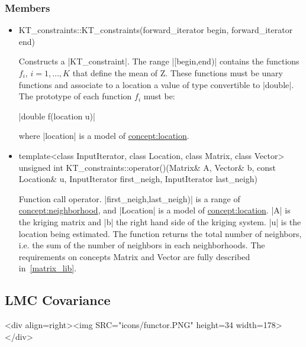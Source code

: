 \documentclass[12pt,twoside]{report}
\begin{document}
 
\htmlrule[CLEAR=all]  \subsubsection*{Members}
\begin{itemize}

\item
 \begin{code} 
KT_constraints::KT_constraints(forward_iterator begin, forward_iterator end)
\end{code}

Constructs a |KT_constraint|. The range |[begin,end)| contains the functions $f_i$, $i=1,\ldots,K$ that define the mean of Z. These functions must be unary functions and associate to a location a value of type convertible to |double|. The prototype of each function $f_i$ must be:

|double f(location u)| 

where |location| is a model of \hyperref{Location}{Location (see Section}{)}{concept:location}.


\item
 \begin{code} 
template<class InputIterator, class Location, class Matrix, class Vector>
unsigned int
KT_constraints::operator()(Matrix& A, Vector& b,
                           const Location& u,
                           InputIterator first_neigh, InputIterator last_neigh)
\end{code}

Function call operator. |first_neigh,last_neigh)| is a range of \hyperref{Neighborhood}{Neighborhood (see Section}{)}{concept:neighborhood}, and |Location| is a model of \hyperref{Location}{Location (see Section}{)}{concept:location}. |A| is the kriging matrix and |b| the right hand side of the kriging system. |u| is the location being estimated. The function returns the total number of neighbors, i.e. the sum of the number of neighbors in each neighborhoods. The requirements on concepts Matrix and Vector are fully described in~\ref{matrix_lib}.
\end{itemize}









\subsection{LMC Covariance}
\begin{htmlonly}
<div align=right><img SRC="icons/functor.PNG" height=34 width=178></div>
\end{htmlonly}
\end{document}
